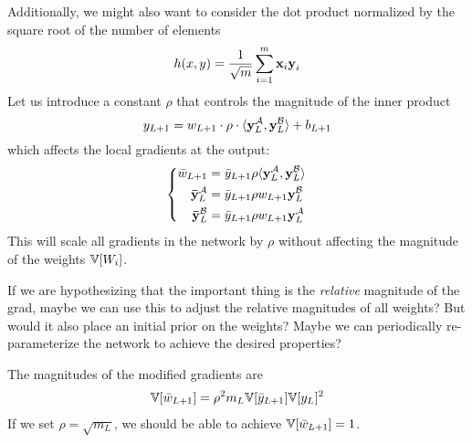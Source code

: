 Additionally, we might also want to consider the dot product normalized by the square root of the number of elements
\begin{equation}
h(x, y) = \frac{1}{\sqrt{m}} \sum_{i = 1}^{m} \boldsymbol{\mathbf{x}}_{i} \boldsymbol{\mathbf{y}}_{i}
\end{equation}
Let us introduce a constant $\rho$ that controls the magnitude of the inner product
\begin{equation}
y_{L+1} = w_{L+1} \cdot \rho \cdot \langle \boldsymbol{\mathbf{y}}_{L}^{\mathcal{A}},  \boldsymbol{\mathbf{y}}_{L}^{\mathcal{B}} \rangle + b_{L+1}
\end{equation}
which affects the local gradients at the output:
\begin{equation}
\left\{ \begin{aligned}
\bar{w}_{L+1} & = \bar{y}_{L+1} \rho \langle \boldsymbol{\mathbf{y}}_{L}^{\mathcal{A}}, \boldsymbol{\mathbf{y}}_{L}^{\mathcal{B}} \rangle \\
\boldsymbol{\mathbf{\bar{y}}}_{L}^{\mathcal{A}} & = \bar{y}_{L+1} \rho w_{L+1} \boldsymbol{\mathbf{y}}_{L}^{\mathcal{B}} \\
\boldsymbol{\mathbf{\bar{y}}}_{L}^{\mathcal{B}} & = \bar{y}_{L+1} \rho w_{L+1} \boldsymbol{\mathbf{y}}_{L}^{\mathcal{A}}
\end{aligned} \right.
\end{equation}
This will scale all gradients in the network by $\rho$ without affecting the magnitude of the weights $\mathbb{V}[W_{i}]$.

If we are hypothesizing that the important thing is the \emph{relative} magnitude of the grad, maybe we can use this to adjust the relative magnitudes of all weights?
But would it also place an initial prior on the weights?
Maybe we can periodically re-parameterize the network to achieve the desired properties?

The magnitudes of the modified gradients are
\begin{align}
\mathbb{V}[\bar{w}_{L+1}] = \rho^{2} m_{L} \mathbb{V}[\bar{y}_{L+1}] \mathbb{V}[y_{L}]^{2}
\end{align}
If we set $\rho = \sqrt{m_{L}}$, we should be able to achieve $\mathbb{V}[\bar{w}_{L+1}] = 1$.



